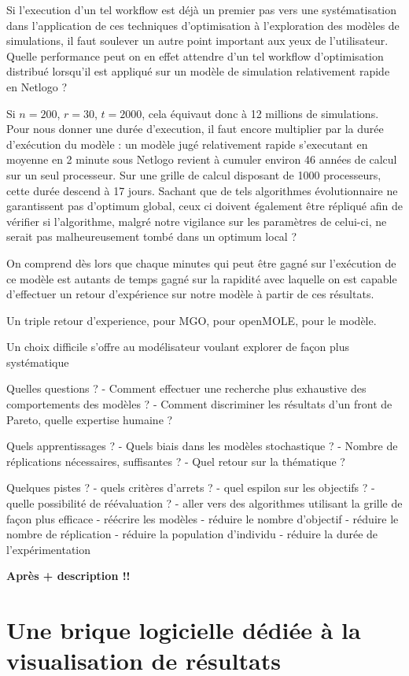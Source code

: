 Si l'execution d'un tel workflow est déjà un premier pas vers une systématisation dans l'application de ces techniques d'optimisation à l'exploration des modèles de simulations, il faut soulever un autre point important aux yeux de l'utilisateur. Quelle performance peut on en effet attendre d'un tel workflow d'optimisation distribué lorsqu'il est appliqué sur un modèle de simulation relativement rapide en Netlogo ?

Si $n=200$, $r = 30$, $t=2000$, cela équivaut donc à 12 millions de simulations. Pour nous donner une durée d'execution, il faut encore multiplier par la durée d'exécution du modèle : un modèle jugé relativement rapide s'executant en moyenne en 2 minute sous Netlogo revient à cumuler environ 46 années de calcul sur un seul processeur. Sur une grille de calcul disposant de 1000 processeurs, cette durée descend à 17 jours. Sachant que de tels algorithmes évolutionnaire ne garantissent pas d'optimum global, ceux ci doivent également être répliqué afin de vérifier si l'algorithme, malgré notre vigilance sur les paramètres de celui-ci, ne serait pas malheureusement tombé dans un optimum local ?

On comprend dès lors que chaque minutes qui peut être gagné sur l'exécution de ce modèle est autants de temps gagné sur la rapidité avec laquelle on est capable d'effectuer un retour d'expérience sur notre modèle à partir de ces résultats. 


Un triple retour d'experience, pour MGO, pour openMOLE, pour le modèle.

Un choix difficile s'offre au modélisateur voulant explorer de façon plus systématique 

Quelles questions ?
- Comment effectuer une recherche plus exhaustive des comportements des modèles ?
- Comment discriminer les résultats d'un front de Pareto, quelle expertise humaine ?

Quels apprentissages ?
- Quels biais dans les modèles stochastique ?
- Nombre de réplications nécessaires, suffisantes ? 
- Quel retour sur la thématique ?

Quelques pistes ?
- quels critères d'arrets ?
- quel espilon sur les objectifs ?
- quelle possibilité de réévaluation ?
- aller vers des algorithmes utilisant la grille de façon plus efficace
- réécrire les modèles
- réduire le nombre d'objectif
- réduire le nombre de réplication 
- réduire la population d'individu
- réduire la durée de l'expérimentation





\textbf{Après + description !!}




\section{Une brique logicielle dédiée à la visualisation de résultats}


